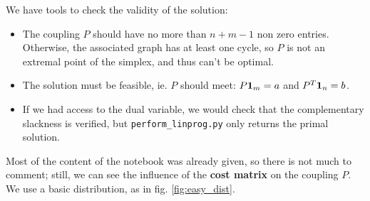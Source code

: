 We have tools to check the validity of the solution: 
\begin{itemize}
    \item The coupling $P$ should have no more than $n+m-1$ non zero entries. Otherwise, the associated graph has at least one cycle, so $P$ is not an extremal point of the simplex, and thus can't be optimal.
    \item The solution must be feasible, ie. $P$ should meet: $P \mathbf{1}_m = a$ and $P^T \mathbf{1}_n = b$.
    \item If we had access to the dual variable, we would check that the complementary slackness is verified, but \texttt{perform\_linprog.py} only returns the primal solution.
\end{itemize}

Most of the content of the notebook was already given, so there is not much to comment; still, we can see the influence of the \textbf{cost matrix} on the coupling $P$. We use a basic distribution, as in fig. \ref{fig:easy_dist}.

